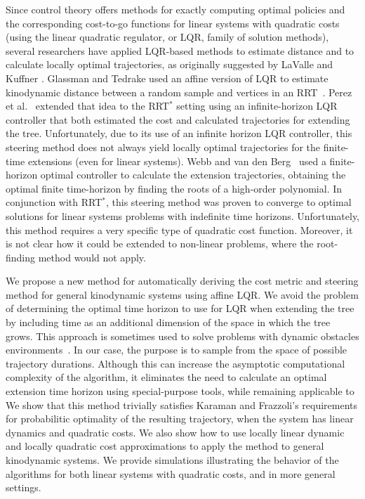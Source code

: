 \documentclass[letterpaper, 10pt, english, conference]{IEEEtran}
\begin{document}
Since control theory offers methods for exactly computing 
optimal policies and the corresponding cost-to-go functions for linear systems
with quadratic costs
(using the linear quadratic regulator, or LQR, family of solution methods),
several researchers have applied LQR-based methods
to estimate distance and to calculate locally optimal
trajectories, as originally suggested by LaValle and Kuffner
\cite{lavalle.kuffner.ijrr01}. 
%
Glassman and Tedrake 
used an affine version of LQR to 
estimate kinodynamic distance
between a random sample and vertices in an RRT~\cite{elena.russ.icra10}.
 Perez et al.~\cite{Perez12} extended
that idea to the RRT$^*$ setting using an
infinite-horizon LQR controller that both estimated 
the cost and calculated trajectories for extending the tree. 
Unfortunately, due to its use of an infinite horizon LQR controller,
this steering method does not always yield
locally optimal trajectories for the finite-time extensions (even for
linear systems). 
Webb and van den Berg~\cite{jur} 
used a finite-horizon optimal controller to calculate the extension
trajectories, obtaining the optimal finite time-horizon by
finding the roots of a high-order polynomial. In conjunction with
RRT$^*$, this steering method was proven to converge to optimal
solutions for linear systems problems with indefinite time
horizons. Unfortunately, this method requires
a very specific type of quadratic cost function.
Moreover, it is not clear
how it could be extended to non-linear problems,
where the
root-finding method would not apply.

We propose a new method for automatically deriving the cost
metric and steering method for general kinodynamic
systems using affine LQR. We avoid the problem of
determining the optimal time horizon to use for LQR when extending
the tree by 
including time as an additional dimension of the space in which the
tree grows. This approach is sometimes
used to solve problems with dynamic obstacles
environments~\cite{lavalle.book06,stillman?}. In our case, the
purpose is to sample from the space of possible trajectory
durations. Although this can increase the
asymptotic computational complexity of the algorithm, it eliminates
the need to calculate an optimal extension time horizon using
special-purpose tools, while remaining applicable to 
We show that this method trivially satisfies
Karaman and Frazzoli's requirements for probabilitic optimality of the
resulting trajectory, when the system has linear dynamics and 
quadratic costs. We also show how to use locally linear dynamic
and locally quadratic cost approximations to apply the method
to general kinodynamic systems. 
We provide simulations illustrating the behavior of the
algorithms for both linear systems with quadratic costs,
and in more general settings.
\end{document}
